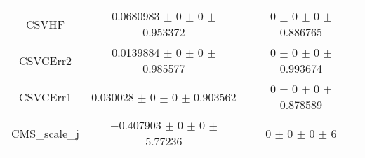 \begin{table}
\begin{tabular}{ccc}
CSVHF & \num{0.0680983} $\pm$ \num{0} $\pm$ \num{0} $\pm$ \num{0.953372} & \num{0} $\pm$ \num{0} $\pm$ \num{0} $\pm$ \num{0.886765}\\
CSVCErr2 & \num{0.0139884} $\pm$ \num{0} $\pm$ \num{0} $\pm$ \num{0.985577} & \num{0} $\pm$ \num{0} $\pm$ \num{0} $\pm$ \num{0.993674}\\
CSVCErr1 & \num{0.030028} $\pm$ \num{0} $\pm$ \num{0} $\pm$ \num{0.903562} & \num{0} $\pm$ \num{0} $\pm$ \num{0} $\pm$ \num{0.878589}\\
CMS\_scale\_j & \num{-0.407903} $\pm$ \num{0} $\pm$ \num{0} $\pm$ \num{5.77236} & \num{0} $\pm$ \num{0} $\pm$ \num{0} $\pm$ \num{6}\\
\bottomrule
\end{tabular}
\end{table}